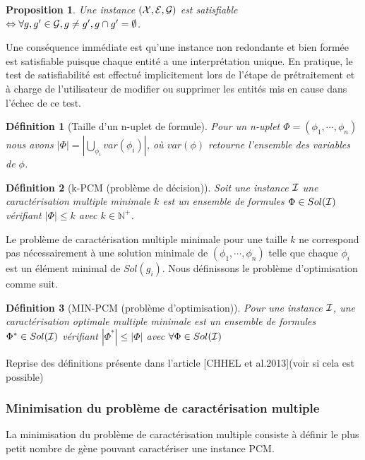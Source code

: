 \documentclass[a4paper,10pt]{article}
\newtheorem{definition}{Définition}
\newtheorem{proposition}{Proposition}
\begin{document}
\begin{proposition}
Une instance $({\cal X},{\cal E},{\cal G})$ est satisfiable $\Leftrightarrow
\forall g,g' \in {\cal G}, g\neq g', g
\cap g' =\emptyset$.
\end{proposition}

Une conséquence immédiate est qu'une instance non redondante et bien formée
est satisfiable puisque chaque entité a une interprétation unique.
En pratique, le test de satisfiabilité est effectué implicitement lors de
l'étape de prétraitement et à charge de l'utilisateur de modifier ou supprimer
les entités mis en cause dans l'échec de ce test.

\begin{definition}[Taille d'un n-uplet de formule]
\label{Flength}
Pour un n-uplet $\Phi=(\phi_1,\cdots,\phi_n)$ nous avons $|\Phi| =
|\bigcup_{\phi_i} var(\phi_{i})|$, où $var({\phi})$ retourne l'ensemble des
variables de
$\phi$.
\end{definition}

\begin{definition}[k-PCM (problème de décision)]
Soit une instance ${\cal I}$ une
caractérisation multiple minimale $k$ est un ensemble de formules
$\Phi \in Sol({\cal I})$ vérifiant $|\Phi| \leq k$ avec $ k\in \mathbb{N}^{+}$.
\end{definition}

Le problème de caractérisation multiple minimale pour une taille $k$ ne
correspond pas nécessairement à une solution minimale de
$(\phi_1,\cdots,\phi_n)$ telle que chaque $\phi_i$ est un élément minimal de
$Sol(g_i)$. Nous définissons le problème d'optimisation comme suit.

\begin{definition}[MIN-PCM (problème d'optimisation)]
Pour une instance ${\cal I}$, une
caractérisation optimale multiple minimale est  un ensemble de formules
$\Phi^* \in Sol({\cal I})$ vérifiant $|\Phi^*| \leq |\Phi|$ avec $\forall \Phi
\in Sol({\cal I})$
\end{definition}

Reprise des définitions présente dans l'article [CHHEL et al.2013](voir si cela est possible)
\subsubsection*{Minimisation du problème de caractérisation multiple}
La minimisation du problème de caractérisation multiple consiste à définir le plus petit nombre de gène pouvant caractériser une instance PCM.
\end{document}
